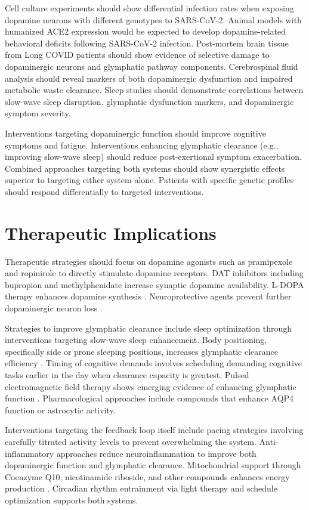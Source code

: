 \documentclass[12pt]{article}
\begin{document}
Cell culture experiments should show differential infection rates when exposing dopamine neurons with different genotypes to SARS-CoV-2. Animal models with humanized ACE2 expression would be expected to develop dopamine-related behavioral deficits following SARS-CoV-2 infection. Post-mortem brain tissue from Long COVID patients should show evidence of selective damage to dopaminergic neurons and glymphatic pathway components. Cerebrospinal fluid analysis should reveal markers of both dopaminergic dysfunction and impaired metabolic waste clearance. Sleep studies should demonstrate correlations between slow-wave sleep disruption, glymphatic dysfunction markers, and dopaminergic symptom severity.

Interventions targeting dopaminergic function should improve cognitive symptoms and fatigue. Interventions enhancing glymphatic clearance (e.g., improving slow-wave sleep) should reduce post-exertional symptom exacerbation. Combined approaches targeting both systems should show synergistic effects superior to targeting either system alone. Patients with specific genetic profiles should respond differentially to targeted interventions.

\section{Therapeutic Implications}

Therapeutic strategies should focus on dopamine agonists such as pramipexole and ropinirole to directly stimulate dopamine receptors. DAT inhibitors including bupropion and methylphenidate increase synaptic dopamine availability. L-DOPA therapy enhances dopamine synthesis \citep{Beauchamp2022, DelPrete2021}. Neuroprotective agents prevent further dopaminergic neuron loss \citep{Limanaqi2022, Nataf2020}.

Strategies to improve glymphatic clearance include sleep optimization through interventions targeting slow-wave sleep enhancement. Body positioning, specifically side or prone sleeping positions, increases glymphatic clearance efficiency \citep{Lee2015}. Timing of cognitive demands involves scheduling demanding cognitive tasks earlier in the day when clearance capacity is greatest. Pulsed electromagnetic field therapy shows emerging evidence of enhancing glymphatic function \citep{Dragicevic2021}. Pharmacological approaches include compounds that enhance AQP4 function or astrocytic activity.

Interventions targeting the feedback loop itself include pacing strategies involving carefully titrated activity levels to prevent overwhelming the system. Anti-inflammatory approaches reduce neuroinflammation to improve both dopaminergic function and glymphatic clearance. Mitochondrial support through Coenzyme Q10, nicotinamide riboside, and other compounds enhances energy production \citep{Stefano2021}. Circadian rhythm entrainment via light therapy and schedule optimization supports both systems.
\end{document}
